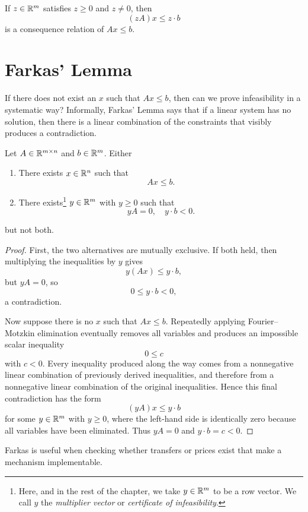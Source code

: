 If $z \in \mathbb{R}^m$ satisfies $z \ge 0$ and $z \ne 0$, then
\[
	(zA)x \le z \cdot b
\]
is a consequence relation of $Ax \le b$.

\section{Farkas' Lemma}

If there does not exist an $x$ such that $Ax \le b$, then can we prove infeasibility in a systematic way?
Informally, Farkas' Lemma says that if a linear system has no solution, then there is a linear combination of the constraints that visibly produces a contradiction.

\begin{lemma}[Farkas']
	Let $A \in \mathbb{R}^{m\times n}$ and $b \in \mathbb{R}^m$. Either
	\begin{enumerate}[label = (\roman*)]
		\item There exists $x \in \mathbb{R}^n$ such that \[
			Ax \le b
		.\] 
		\item There exists\footnote{Here, and in the rest of the chapter, we take $y \in \mathbb{R}^m$ to be a row vector. We call $y$ the \emph{multiplier vector} or \emph{certificate of infeasibility}.} $y \in \mathbb{R}^m$ with $y \ge 0$ such that \[
			y A  = 0, \quad y \cdot b < 0
		.\]
	\end{enumerate}
	but not both.
\end{lemma}
\begin{proof}
	First, the two alternatives are mutually exclusive. If both held, then multiplying the inequalities by $y$ gives \[
		y\left( Ax \right) \le y \cdot b
	,\] but $yA = 0$, so \[
		0 \le y \cdot  b < 0
	,\]  a contradiction.

	Now suppose there is no $x$ such that $Ax \le b$. Repeatedly applying Fourier--Motzkin elimination eventually removes all variables and produces an impossible scalar inequality
	\[
		0 \le c
	\]
	with $c<0$. Every inequality produced along the way comes from a nonnegative linear combination of previously derived inequalities, and therefore from a nonnegative linear combination of the original inequalities. Hence this final contradiction has the form
	\[
		(yA)x \le y \cdot b
	\]
	for some $y \in \mathbb{R}^m$ with $y \ge 0$, where the left-hand side is identically zero because all variables have been eliminated. Thus $yA=0$ and $y \cdot b = c < 0$.
\end{proof}

Farkas is useful when checking whether transfers or prices exist that make a mechanism implementable.

